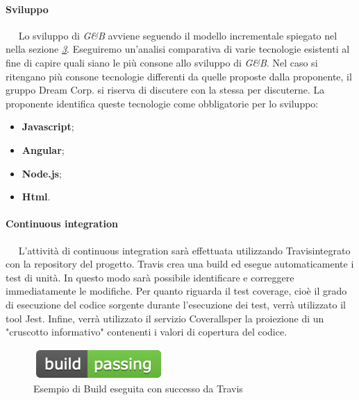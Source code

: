 	    
	    \paragraph{Sviluppo}~\newline ~\newline
	    Lo sviluppo di \textit{G\&B} avviene seguendo il modello incrementale spiegato nel \PdP nella sezione \textit{\underline{3}}. Eseguiremo un’analisi comparativa di varie tecnologie esistenti al fine di capire quali siano le più consone allo sviluppo di \textit{G\&B}.  Nel caso si ritengano più consone tecnologie differenti da quelle proposte dalla proponente, il gruppo Dream Corp. si riserva di discutere con la stessa per discuterne. La proponente identifica queste tecnologie come obbligatorie per lo sviluppo:
	    \begin{itemize}
	        \item \textbf{Javascript\pedice};
	        \item \textbf{Angular};
	        \item \textbf{Node.js\pedice};
	        \item \textbf{Html}.
	    \end{itemize}
	    \paragraph{Continuous integration}~\newline ~\newline
	    L'attività di continuous integration sarà effettuata utilizzando Travis\pedice integrato con la repository del progetto. Travis crea una build ed esegue automaticamente i test di unità. In questo modo sarà possibile identificare e correggere immediatamente le modifiche. Per quanto riguarda il test coverage, cioè il grado di esecuzione del codice sorgente durante l’esecuzione dei test, verrà utilizzato il tool Jest\pedice. Infine, verrà utilizzato il servizio Coveralls\pedice per la proiezione di un "cruscotto informativo" contenenti i valori di copertura del codice.
	    \begin{figure}[!htbp]
		    \centering
		    \includegraphics{BuildPassed.png}
		    \caption{Esempio di Build eseguita con successo da Travis}
	    \end{figure}
	    
